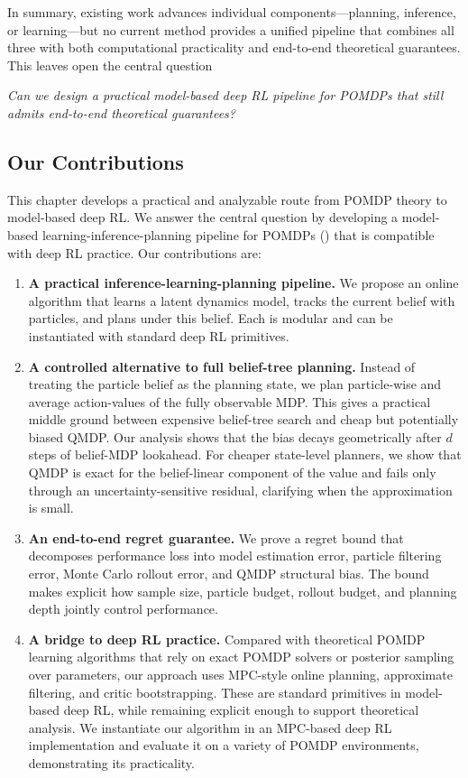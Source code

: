 In summary, existing work advances individual components---planning, inference, or learning---but no current method provides a unified pipeline that combines all three with both computational practicality and end-to-end theoretical guarantees. This leaves open the central question
\begin{center}
    \textit{Can we design a practical model-based deep RL pipeline for POMDPs
that still admits end-to-end theoretical guarantees?}
\end{center}


\subsection{Our Contributions}

This chapter develops a practical and analyzable route from POMDP theory to model-based deep RL. We answer the central question by developing a model-based learning-inference-planning pipeline for POMDPs () that is compatible with deep RL practice. Our contributions are:
\begin{enumerate}
    \item \textbf{A practical inference-learning-planning pipeline.} We propose an online algorithm that learns a latent dynamics model, tracks the current belief with particles, and plans under this belief. Each is modular and can be instantiated with standard deep RL primitives.


    \item \textbf{A controlled alternative to full belief-tree planning.} Instead of treating the particle belief as the planning state, we plan particle-wise and average action-values of the fully observable MDP. This gives a practical middle ground between expensive belief-tree search and cheap but potentially biased QMDP. Our analysis shows that the bias decays geometrically after $d$ steps of belief-MDP lookahead. For cheaper state-level planners, we show that QMDP is exact for the belief-linear component of the value and fails only through an uncertainty-sensitive residual, clarifying when the approximation is small.

    \item \textbf{An end-to-end regret guarantee.}
    We prove a regret bound that decomposes performance loss into model estimation error, particle filtering error, Monte Carlo rollout error, and QMDP structural bias. The bound makes explicit how sample size, particle budget, rollout budget, and planning depth jointly control performance.

    \item \textbf{A bridge to deep RL practice.}
    Compared with theoretical POMDP learning algorithms that rely on exact POMDP solvers or posterior sampling over parameters, our approach uses MPC-style online planning, approximate filtering, and critic bootstrapping. These are standard primitives in model-based deep RL, while remaining explicit enough to support theoretical analysis. We instantiate our algorithm in an MPC-based deep RL implementation and evaluate it on a variety of POMDP environments, demonstrating its practicality. 
\end{enumerate}



